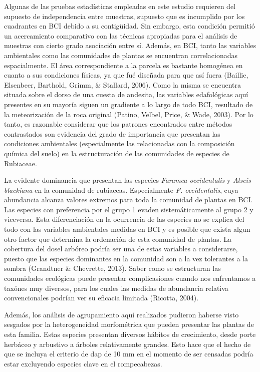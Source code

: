 \documentclass[11pt,]{article}
\begin{document}
Algunas de las pruebas estadísticas empleadas en este estudio requieren
del supuesto de independencia entre muestras, supuesto que es incumplido
por los cuadrantes en BCI debido a su contigüidad. Sin embargo, esta
condición permitió un acercamiento comparativo con las técnicas
apropiadas para el análisis de muestras con cierto grado asociación
entre sí. Además, en BCI, tanto las variables ambientales como las
comunidades de plantas se encuentran correlacionadas espacialmente. El
área correspondiente a la parcela es bastante homogénea en cuanto a sus
condiciones físicas, ya que fué diseñada para que así fuera (Baillie,
Elsenbeer, Barthold, Grimm, \& Stallard, 2006). Como la misma se
encuentra situada sobre el dorso de una cuesta de andesita, las
variables edafológicas aquí presentes en su mayoría siguen un gradiente
a lo largo de todo BCI, resultado de la meteorización de la roca
original (Patino, Velbel, Price, \& Wade, 2003). Por lo tanto, es
razonable considerar que los patrones encontrados entre métodos
contrastados son evidencia del grado de importancia que presentan las
condiciones ambientales (especialmente las relacionadas con la
composición química del suelo) en la estructuración de las comunidades
de especies de Rubiaceae.

La evidente dominancia que presentan las especies \emph{Faramea
occidentalis} y \emph{Alseis blackiana} en la comunidad de rubiaceas.
Especialmente \emph{F. occidentalis}, cuya abundancia alcanza valores
extremos para toda la comunidad de plantas en BCI. Las especies con
preferencia por el grupo 1 evaden sistemáticamente al grupo 2 y
viceversa. Esta diferenciación en la ocurrencia de las especies no se
explica del todo con las variables ambientales medidas en BCI y es
posible que exista algun otro factor que determina la ordenación de esta
comunidad de plantas. La cobertura del dosel arbóreo podría ser una de
estas variables a considerarse, puesto que las especies dominantes en la
comunidad son a la vez tolerantes a la sombra (Grandtner \& Chevrette,
2013). Saber como se estructuran las comunidades ecológicas puede
presentar complicasiones cuando nos enfrentamos a taxónes muy diversos,
para los cuales las medidas de abundancia relativa convencionales
podrían ver su eficacia limitada (Ricotta, 2004).

Además, los análisis de agrupamiento aquí realizados pudieron haberse
visto sesgados por la heterogeneidad morfométrica que pueden presentar
las plantas de esta familia. Estas especies presentan diversos hábitos
de crecimiento, desde porte herbáceo y arbustivo a árboles relativamente
grandes. Esto hace que el hecho de que se incluya el criterio de dap de
10 mm en el momento de ser censadas podría estar excluyendo especies
clave en el rompecabezas.
\end{document}
